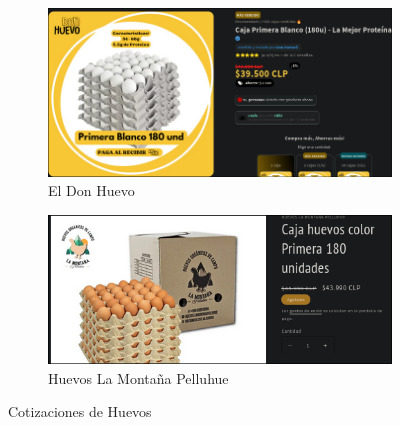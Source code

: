 \documentclass[12pt]{article}
\begin{document}
    \begin{figure}[H]
        \centering
        \begin{subfigure}{0.48\textwidth}
            \centering
            \includegraphics[width=\linewidth]{donhuevo}
            \caption{El Don Huevo}
            \label{fig:don_huevo}
        \end{subfigure}
        \hfill
        \begin{subfigure}{0.48\textwidth}
            \centering
            \includegraphics[width=\linewidth]{montan1}
            \caption{Huevos La Montaña Pelluhue}
            \label{fig:huevos_montaña}
        \end{subfigure}
        \caption{Cotizaciones de Huevos}
        \label{fig:cotizaciones_huevos}
    \end{figure}
\end{document}
